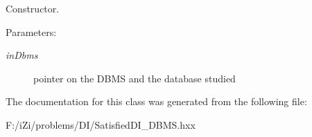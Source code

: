 Constructor. 

\begin{Desc}
\item[Parameters:]
\begin{description}
\item[{\em in\-Dbms}]pointer on the DBMS and the database studied \end{description}
\end{Desc}


The documentation for this class was generated from the following file:\begin{CompactItemize}
\item 
F:/i\-Zi/problems/DI/Satisfied\-DI\_\-DBMS.hxx\end{CompactItemize}
